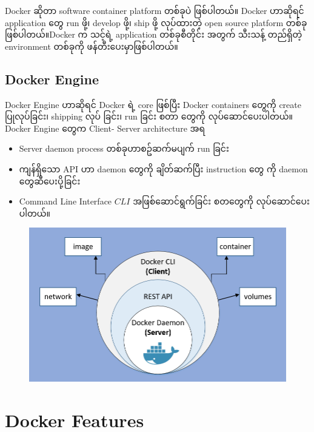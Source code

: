 \documentclass{article}
\begin{document}
Docker ဆိုတာ software container platform တစ်ခုပဲ ဖြစ်ပါတယ်။ Docker
ဟာဆိုရင် application ​တွေ run ဖို့၊ develop ဖို့၊ ship ဖို့ လုပ်ထားတဲ့
open source platform တစ်ခုဖြစ်ပါတယ်။Docker က သင့်ရဲ့ application
တစ်ခုစီတိုင်း အတွက် သီးသန့် တည်ရှိတဲ့ environment တစ်ခုကို
ဖန်တီး​ပေးမှာဖြစ်ပါတယ်။

\subsection{Docker Engine}\label{docker-engine}

Docker Engine ဟာဆိုရင် Docker ရဲ့ core ဖြစ်ပြီး Docker containers
​တွေကို create ပြုလုပ်​ခြင်း၊ shipping လုပ် ခြင်း၊ run ခြင်း စတာ ​တွေကို
လုပ်​ဆောင်​ပေးပါတယ်။ Docker Engine ​တွေက Client- Server architecture အရ

\begin{itemize}
\itemsep1pt\parskip0pt
\item
  Server daemon process တစ်ခုဟာစဥ်ဆက်မပျက် run ခြင်း\\
\item
  ကျန်ရှိ​သော API ဟာ daemon ​တွေကို ချိတ်ဆက်ပြီး instruction ​တွေ ကို
  daemon ​တွေဆီ ​ပေးပို့ခြင်း\\
\item
  Command Line Interface $CLI$ အဖြစ်​ဆောင်ရွက်ခြင်း စတ​တွေကို
  လုပ်​ဆောင်​ပေးပါတယ်။
\end{itemize}

\begin{figure}[htbp]
\centering
\includegraphics[width=0.70\paperwidth]{.gitbook/assets/screenshot-129.png}
\end{figure}

\pagebreak

\section{Docker Features}\label{docker-features}
\end{document}
